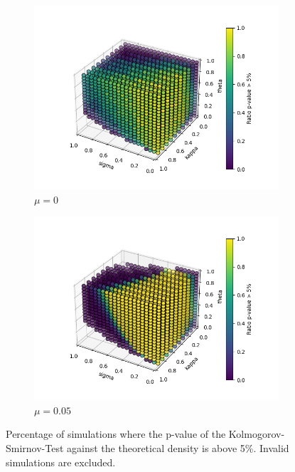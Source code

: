 \begin{figure}
    \centering
    \begin{subfigure}[b]{0.4\textwidth}
        \centering
        \includegraphics[width=\textwidth]{img/GC_cum_KS_3d_p_value_sigma_kappa_theta_muzero.png}
        \caption{$\mu=0$}
        \label{fig:GC_cum_KS_3d_p_value_sigma_kappa_theta_muzero}
    \end{subfigure}
    \hfill
    \begin{subfigure}[b]{0.4\textwidth}
        \centering
        \includegraphics[width=\textwidth]{img/GC_cum_KS_3d_p_value_sigma_kappa_theta.png}
        \caption{$\mu=0.05$}
        \label{fig:GC_cum_KS_3d_p_value_sigma_kappa_theta}
    \end{subfigure}
    \caption{Percentage of simulations where the p-value of the Kolmogorov-Smirnov-Test against the theoretical density is above 5\%. Invalid simulations are excluded.}
    \label{fig:GC_cum_KS_3d}
\end{figure}

